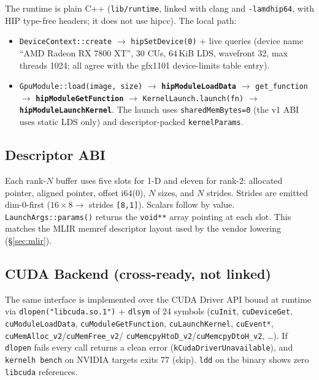 \documentclass[10pt,twoside]{article}
\begin{document}
The runtime is plain C++ (\texttt{lib/runtime}, linked with clang and
\texttt{-lamdhip64}, with HIP type-free headers; it does not use hipcc). The local path:

\begin{itemize}
  \item \texttt{DeviceContext::create} $\to$ \texttt{hipSetDevice(0)} + live queries
        (device name ``AMD Radeon RX 7800 XT'', 30 CUs, 64\,KiB LDS, wavefront 32, max threads
        1024; all agree with the gfx1101 device-limits table entry).
  \item \texttt{GpuModule::load(image, size)} $\to$ \textbf{\texttt{hipModuleLoadData}}
        $\to$ \texttt{get\_function} $\to$ \textbf{\texttt{hipModuleGetFunction}} $\to$
        \texttt{KernelLaunch.launch(fn)} $\to$ \textbf{\texttt{hipModuleLaunchKernel}}. The
        launch uses \texttt{sharedMemBytes=0} (the v1 ABI uses static LDS only) and
        descriptor-packed \texttt{kernelParams}.
\end{itemize}

\subsection{Descriptor ABI}
\label{sec:descriptor}

Each rank-$N$ buffer uses five slots for 1-D and eleven for rank-2: allocated pointer,
aligned pointer, offset i64(0), $N$ sizes, and $N$ strides. Strides are emitted
dim-0-first ($16\times 8 \to$ strides \texttt{[8,1]}). Scalars follow by value.
\texttt{LaunchArgs::params()} returns the \texttt{void**} array pointing at each slot.
This matches the MLIR memref descriptor layout used by the vendor lowering
(\S\ref{sec:mlir}).

\subsection{CUDA Backend (cross-ready, not linked)}
\label{sec:cuda}

The same interface is implemented over the CUDA Driver API bound at runtime via
\texttt{dlopen("libcuda.so.1")} + \texttt{dlsym} of 24 symbols (\texttt{cuInit},
\texttt{cuDeviceGet}, \texttt{cuModuleLoadData}, \texttt{cuModuleGetFunction},
\texttt{cuLaunchKernel}, \texttt{cuEvent*}, \texttt{cuMemAlloc\_v2}/\texttt{cuMemFree\_v2}/
\texttt{cuMemcpyHtoD\_v2}/\texttt{cuMemcpyDtoH\_v2}, \dots). If \texttt{dlopen} fails every
call returns a clean error (\texttt{kCudaDriverUnavailable}), and \texttt{kernelh bench} on
NVIDIA targets exits 77 (skip). \texttt{ldd} on the binary shows zero \texttt{libcuda}
references.
\end{document}
